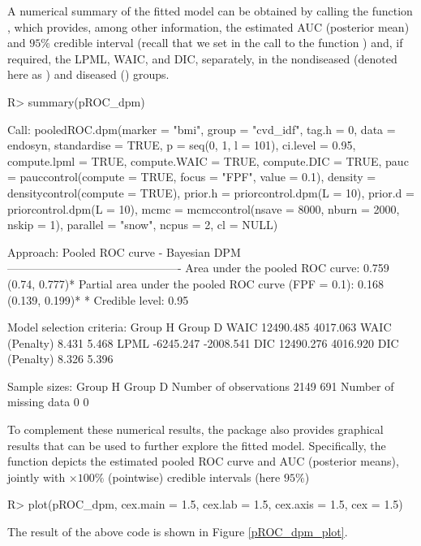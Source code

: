 A numerical summary of the fitted model can be obtained by calling the function , which provides, among other information, the estimated AUC (posterior mean) and $95\%$ credible interval (recall that we set in the call to the function ) and, if required, the LPML, WAIC, and DIC, separately, in the nondiseased (denoted here as ) and diseased () groups.
\begin{example}
R> summary(pROC_dpm)
\end{example}
\begin{example}
Call:
pooledROC.dpm(marker = "bmi", group = "cvd_idf", tag.h = 0, data = endosyn, 
    standardise = TRUE, p = seq(0, 1, l = 101), ci.level = 0.95, 
    compute.lpml = TRUE, compute.WAIC = TRUE, compute.DIC = TRUE, 
    pauc = pauccontrol(compute = TRUE, focus = "FPF", value = 0.1), 
    density = densitycontrol(compute = TRUE), prior.h = priorcontrol.dpm(L = 10), 
    prior.d = priorcontrol.dpm(L = 10), mcmc = mcmccontrol(nsave = 8000, 
        nburn = 2000, nskip = 1), parallel = "snow", ncpus = 2, cl = NULL)

Approach: Pooled ROC curve - Bayesian DPM
----------------------------------------------
Area under the pooled ROC curve: 0.759 (0.74, 0.777)*
Partial area under the pooled ROC curve (FPF = 0.1): 0.168 (0.139, 0.199)*
 * Credible level:  0.95

Model selection criteria:
                     Group H       Group D
WAIC               12490.485      4017.063
WAIC (Penalty)         8.431         5.468
LPML               -6245.247     -2008.541
DIC                12490.276      4016.920
DIC (Penalty)          8.326         5.396


Sample sizes:
                           Group H     Group D
Number of observations        2149         691
Number of missing data           0           0
\end{example}
To complement these numerical results, the  package also provides graphical results that can be used to further explore the fitted model. Specifically, the function  depicts the estimated pooled ROC curve and AUC (posterior means), jointly with $\times 100\%$ (pointwise) credible intervals (here $95\%$)
\begin{example}
R> plot(pROC_dpm, cex.main = 1.5, cex.lab = 1.5, cex.axis = 1.5, cex = 1.5)
\end{example}
The result of the above code is shown in Figure \ref{pROC_dpm_plot}. 
